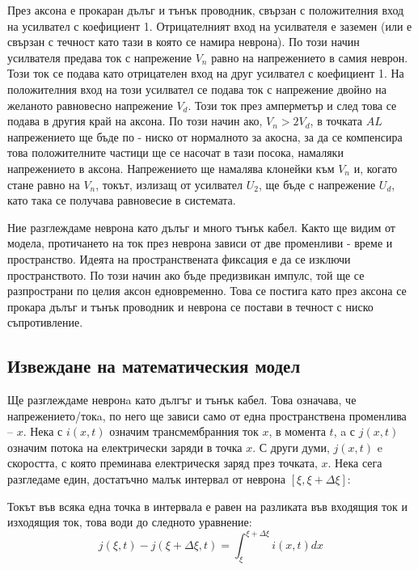 \documentclass{article}
\numberwithin{equation}{section}
\begin{document}
        През аксона е прокаран дълъг и тънък проводник, свързан с положителния вход на усилвател с коефициент 1. Отрицателният вход на усилвателя
        е заземен (или е свързан с течност като тази в която се намира неврона). По този начин усилвателя предава ток с напрежение $V_n$ равно на
        напрежението в самия неврон. Този ток се подава като отрицателен вход на друг усилвател с коефициент 1. На положителния вход на този
        усилвател се подава ток с напрежение двойно на желаното равновесно напрежение $V_d$. Този ток през амперметър и след това се подава в
        другия край на аксона. По този начин ако, $V_n > 2V_d$, в точката $AL$ напрежението ще бъде по - ниско от нормалното за акосна, за да се
        компенсира това положителните частици ще се насочат в тази посока, намаляки напрежението в аксона. Напрежението ще намалява клонейки към
        $V_n$ и, когато стане равно на $V_n$, токът, излизащ от усилвател $U_2$, ще бъде с напрежение $U_d$, като така се получава равновесие в
        системата.

        Ние разглеждаме неврона като дълъг и много тънък кабел. Както ще видим от модела, протичането на ток през неврона
        зависи от две променливи - време и пространство. Идеята на пространствената фиксация е да се изключи пространството.
        По този начин ако бъде предизвикан импулс, той ще се разпространи по целия аксон едновременно. Това се постига като
        през аксона се прокара дълъг и тънък проводник и неврона се постави в течност с ниско съпротивление.
    \subsection{Извеждане на математическия модел}
    Ще разглеждаме невронa като дългъг и тънък кабел. Това означава, че напрежението/токa, по него ще зависи само от една пространствена
    променлива -- $x$. Нека с $i\left(x, t\right)$ означим трансмембранния ток $x$, в момента $t$, a с $j\left(x, t\right)$ означим потока на електрически заряди в точка $x$. С други думи, $j\left(x, t\right)$ e
    скоростта, с която преминава електрическя заряд през точката, $x$. Нека сега разгледаме един, достатъчно малък интервал от неврона
    $\left[\xi, \xi+\Delta\xi\right]$:

    \begin{figure}[H]
        
        \caption{}
    \end{figure}

    Токът във всяка една точка в интервала е равен на разликата във входящия ток и изходящия ток, това води до следното уравнение:
    \begin{equation}\label{integral_form}
        j\left(\xi,t\right) - j\left(\xi + \Delta\xi, t\right) = \int_{\xi}^{\xi + \Delta\xi} i\left(x,t\right)dx
    \end{equation}
\end{document}
